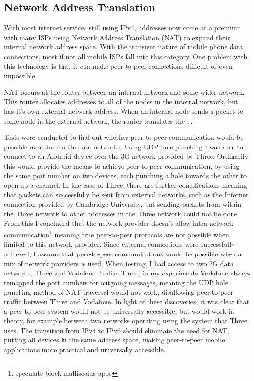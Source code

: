 \subsection{Network Address Translation}

With most internet services still using IPv4, addresses now come at a premium with many ISPs using Network Address Translation (NAT) to expand their internal network address space. With the transient nature of mobile phone data connections, most if not all mobile ISPs fall into this category. One problem with this technology is that it can make peer-to-peer connections difficult or even impossible.

NAT occurs at the router between an internal network and some wider network. This router allocates addresses to all of the nodes in the internal network, but has it's own external network address. When an internal node sends a packet to some node in the external network, the router translates the ...

Tests were conducted to find out whether peer-to-peer communication would be possible over the mobile data networks.
Using UDP hole punching I was able to connect to an Android device over the 3G network provided by Three. Ordinarily this would provide the means to achieve peer-to-peer communication, by using the same port number on two devices, each punching a hole towards the other to open up a channel. In the case of Three, there are further complications meaning that packets can successfully be sent from external networks, such as the Internet connection provided by Cambridge University, but sending packets from within the Three network to other addresses in the Three network could not be done. From this I concluded that the network provider doesn't allow intra-network communication\footnote{speculate block malliscoius apps} meaning true peer-to-peer protocols are not possible when limited to this network provider. Since external connections were successfully achieved, I assume that peer-to-peer communications would be possible when a mix of network providers is used. When testing, I had access to two 3G data networks, Three and Vodafone. Unlike Three, in my experiments Vodafone always remapped the port numbers for outgoing messages, meaning the UDP hole punching method of NAT traversal would not work, disallowing peer-to-peer traffic between Three and Vodafone.
In light of these discoveries, it was clear that a peer-to-peer system would not be universally accessible, but would work in theory, for example between two networks operating using the system that Three uses. The transition from IPv4 to IPv6 should eliminate the need for NAT, putting all devices in the same address space, making peer-to-peer mobile applications more practical and universally accessible.

